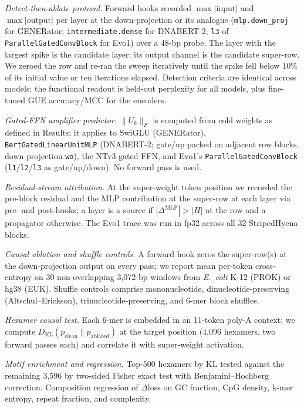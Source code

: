 \documentclass[11pt]{article}
\begin{document}
\textit{Detect-then-ablate protocol.}
Forward hooks recorded $\max|\mathrm{input}|$ and
$\max|\mathrm{output}|$ per layer at the down-projection or its analogue
(\texttt{mlp.down\_proj} for GENERator;
\texttt{intermediate.dense} for DNABERT-2;
\texttt{l3} of \texttt{ParallelGatedConvBlock} for Evo1) over a 48-bp
probe. The layer with the largest spike is the candidate layer; its
output channel is the candidate super-row. We zeroed the row and re-ran
the sweep iteratively until the spike fell below 10\% of its initial
value or ten iterations elapsed. Detection criteria are identical across
models; the functional readout is held-out perplexity for all models,
plus fine-tuned GUE accuracy/MCC for the encoders.

\textit{Gated-FFN amplifier predictor.}
$\|U_k\|_F$ is computed from cold weights as defined in Results; it
applies to SwiGLU (GENERator), \texttt{BertGatedLinearUnitMLP}
(DNABERT-2; gate/up packed on adjacent row blocks, down projection
\texttt{wo}), the NTv3 gated FFN, and Evo1's
\texttt{ParallelGatedConvBlock} (\texttt{l1}/\texttt{l2}/\texttt{l3} as
gate/up/down). No forward pass is used.

\textit{Residual-stream attribution.}
At the super-weight token position we recorded the pre-block residual
and the MLP contribution at the super-row at each layer via pre- and
post-hooks; a layer is a source if $|\Delta^{\mathrm{MLP}}|>|H|$ at the
row and a propagator otherwise. The Evo1 trace was run in fp32 across all
32 StripedHyena blocks.

\textit{Causal ablation and shuffle controls.}
A forward hook zeros the super-row(s) at the down-projection output on
every pass; we report mean per-token cross-entropy on 30 non-overlapping
3{,}072-bp windows from \textit{E.~coli} K-12 (PROK) or hg38 (EUK).
Shuffle controls comprise mononucleotide, dinucleotide-preserving
(Altschul--Erickson), trinucleotide-preserving, and 6-mer block shuffles.

\textit{Hexamer causal test.}
Each 6-mer is embedded in an 11-token poly-A context; we compute
$D_{\mathrm{KL}}(p_{\text{clean}}\|p_{\text{ablated}})$ at the target
position (4{,}096 hexamers, two forward passes each) and correlate it
with super-weight activation.

\textit{Motif enrichment and regression.}
Top-500 hexamers by KL tested against the remaining 3{,}596 by two-sided
Fisher exact test with Benjamini--Hochberg correction. Composition
regression of $\Delta\mathrm{loss}$ on GC fraction, CpG density, k-mer
entropy, repeat fraction, and complexity.
\end{document}
